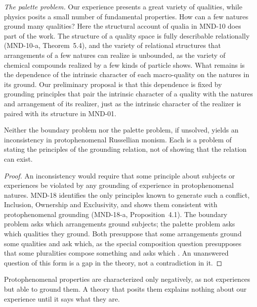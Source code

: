 \documentclass{situationist-preprint}
\begin{document}
\emph{The palette problem.} Our experience presents a great variety of qualities, while physics posits a small number of fundamental properties. How can a few natures ground many qualities? Here the structural account of qualia in MND-10 does part of the work. The structure of a quality space is fully describable relationally (MND-10-a, Theorem~5.4), and the variety of relational structures that arrangements of a few natures can realize is unbounded, as the variety of chemical compounds realized by a few kinds of particle shows. What remains is the dependence of the intrinsic character of each macro-quality on the natures in its ground. Our preliminary proposal is that this dependence is fixed by grounding principles that pair the intrinsic character of a quality with the natures and arrangement of its realizer, just as the intrinsic character of the realizer is paired with its structure in MND-01.

\begin{proposition}\label{p:articulation}
Neither the boundary problem nor the palette problem, if unsolved, yields an inconsistency in protophenomenal Russellian monism. Each is a problem of stating the principles of the grounding relation, not of showing that the relation can exist.
\end{proposition}

\begin{proof}
An inconsistency would require that some principle about subjects or experiences be violated by any grounding of experience in protophenomenal natures. MND-18 identifies the only principles known to generate such a conflict, Inclusion, Ownership and Exclusivity, and shows them consistent with protophenomenal grounding (MND-18-a, Proposition~4.1). The boundary problem asks which arrangements ground subjects; the palette problem asks which qualities they ground. Both presuppose that some arrangements ground some qualities and ask which, as the special composition question presupposes that some pluralities compose something and asks which \citep{vanInwagen1990}. An unanswered question of this form is a gap in the theory, not a contradiction in it.
\end{proof}

\begin{objection}
Protophenomenal properties are characterized only negatively, as not experiences but able to ground them. A theory that posits them explains nothing about our experience until it says what they are.
\end{objection}
\end{document}
